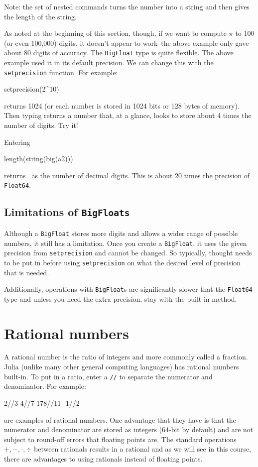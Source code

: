 Note: the set of nested commands turns the number into a string and then gives the length of the string.

As noted at the beginning of this section, though, if we want to compute $\pi$ to 100 (or even 100,000) digits, it doesn't appear to work--the above example only gave about 80 digits of accuracy.  The \texttt{BigFloat} type is quite flexible.  The above example used it in its default precision. We can change this with the \texttt{setprecision} function. For
example:

\begin{jlblock}[types]
setprecision(2^10)
\end{jlblock}
%
returns 1024 (or each number is stored in 1024 bits or 128 bytes of memory). Then
typing  returns a number that, at a glance, looks to store about 4 times the number of digits. Try it!

Entering
\begin{jlblock}[types]
length(string(big(a2)))
\end{jlblock}
%
returns  \printpythontex[verb] ~as the number of decimal digits. This is about 20 times the precision of \texttt{Float64}.  

\subsection{Limitations of \texttt{BigFloats}}

Although a \texttt{BigFloat} stores more digits and allows a wider range of possible numbers, it still has a limitation.  Once you create a \texttt{BigFloat}, it uses the given precision from \texttt{setprecision} and cannot be changed.  So typically, thought needs to be put in before using \texttt{setprecision} on what the desired level of precision that is needed.  

Additionally, operations with \texttt{BigFloat}s are significantly slower that the \texttt{Float64} type and unless you need the extra precision, stay with the built-in method.  


\section{Rational numbers}

A rational number is the ratio of integers and more commonly called a
fraction. Julia (unlike many other general computing languages) has
rational numbers built-in. To put in a ratio, enter a \texttt{//} to
separate the numerator and denominator. For example:
%
\begin{jlblock}[types]
2//3
4//7
178//11
-1//2
\end{jlblock}
%
are examples of rational numbers. One advantage that they have is that
the numerator and denominator are stored as integers (64-bit by default)
and are not subject to round-off errors that floating points are. The
standard operations $+,-,\cdot,\div$ between rationals results in a
rational and as we will see in this course, there are advantages to
using rationals instead of floating points.


